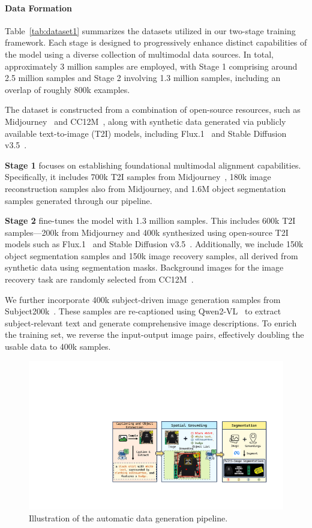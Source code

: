 \paragraph{Data Formation}
Table~\ref{tab:dataset1} summarizes the datasets utilized in our two-stage training framework. Each stage is designed to progressively enhance distinct capabilities of the model using a diverse collection of multimodal data sources. In total, approximately 3 million samples are employed, with Stage 1 comprising around 2.5 million samples and Stage 2 involving 1.3 million samples, including an overlap of roughly 800k examples.

The dataset is constructed from a combination of open-source resources, such as Midjourney~\citep{midjourney-niji-1m-llavanext} and CC12M~\citep{changpinyo2021cc12m}, along with synthetic data generated via publicly available text-to-image (T2I) models, including Flux.1~\citep{flux} and Stable Diffusion v3.5~\citep{2024SD3}.

\textbf{Stage 1} focuses on establishing foundational multimodal alignment capabilities. Specifically, it includes 700k T2I samples from Midjourney~\citep{midjourney-niji-1m-llavanext}, 180k image reconstruction samples also from Midjourney, and 1.6M object segmentation samples generated through our pipeline.

\textbf{Stage 2} fine-tunes the model with 1.3 million samples. This includes 600k T2I samples—200k from Midjourney and 400k synthesized using open-source T2I models such as Flux.1~\citep{flux} and Stable Diffusion v3.5~\citep{2024SD3}. Additionally, we include 150k object segmentation samples and 150k image recovery samples, all derived from synthetic data using segmentation masks. Background images for the image recovery task are randomly selected from CC12M~\citep{changpinyo2021cc12m}.

We further incorporate 400k subject-driven image generation samples from Subject200k~\citep{OminiControl}. These samples are re-captioned using Qwen2-VL~\citep{Qwen2vl} to extract subject-relevant text and generate comprehensive image descriptions. To enrich the training set, we reverse the input-output image pairs, effectively doubling the usable data to 400k samples.


\begin{figure}[t]
\centering
\includegraphics[width=1.0\textwidth]{figures/data_construct.pdf}
\caption{Illustration of the automatic data generation pipeline.}
\label{fig:construction}
\end{figure}

